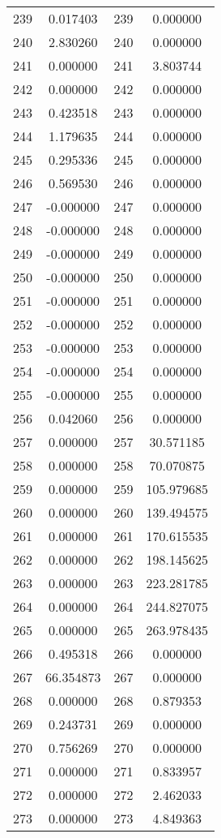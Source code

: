 \documentclass[12pt]{article}
\begin{document}
\begin{longtable}{@{}cccc@{}}
239 & 0.017403 & 239 & 0.000000 \\
240 & 2.830260 & 240 & 0.000000 \\
241 & 0.000000 & 241 & 3.803744 \\
242 & 0.000000 & 242 & 0.000000 \\
243 & 0.423518 & 243 & 0.000000 \\
244 & 1.179635 & 244 & 0.000000 \\
245 & 0.295336 & 245 & 0.000000 \\
246 & 0.569530 & 246 & 0.000000 \\
247 & -0.000000 & 247 & 0.000000 \\
248 & -0.000000 & 248 & 0.000000 \\
249 & -0.000000 & 249 & 0.000000 \\
250 & -0.000000 & 250 & 0.000000 \\
251 & -0.000000 & 251 & 0.000000 \\
252 & -0.000000 & 252 & 0.000000 \\
253 & -0.000000 & 253 & 0.000000 \\
254 & -0.000000 & 254 & 0.000000 \\
255 & -0.000000 & 255 & 0.000000 \\
256 & 0.042060 & 256 & 0.000000 \\
257 & 0.000000 & 257 & 30.571185 \\
258 & 0.000000 & 258 & 70.070875 \\
259 & 0.000000 & 259 & 105.979685 \\
260 & 0.000000 & 260 & 139.494575 \\
261 & 0.000000 & 261 & 170.615535 \\
262 & 0.000000 & 262 & 198.145625 \\
263 & 0.000000 & 263 & 223.281785 \\
264 & 0.000000 & 264 & 244.827075 \\
265 & 0.000000 & 265 & 263.978435 \\
266 & 0.495318 & 266 & 0.000000 \\
267 & 66.354873 & 267 & 0.000000 \\
268 & 0.000000 & 268 & 0.879353 \\
269 & 0.243731 & 269 & 0.000000 \\
270 & 0.756269 & 270 & 0.000000 \\
271 & 0.000000 & 271 & 0.833957 \\
272 & 0.000000 & 272 & 2.462033 \\
273 & 0.000000 & 273 & 4.849363 \\

\end{longtable}
\end{document}
